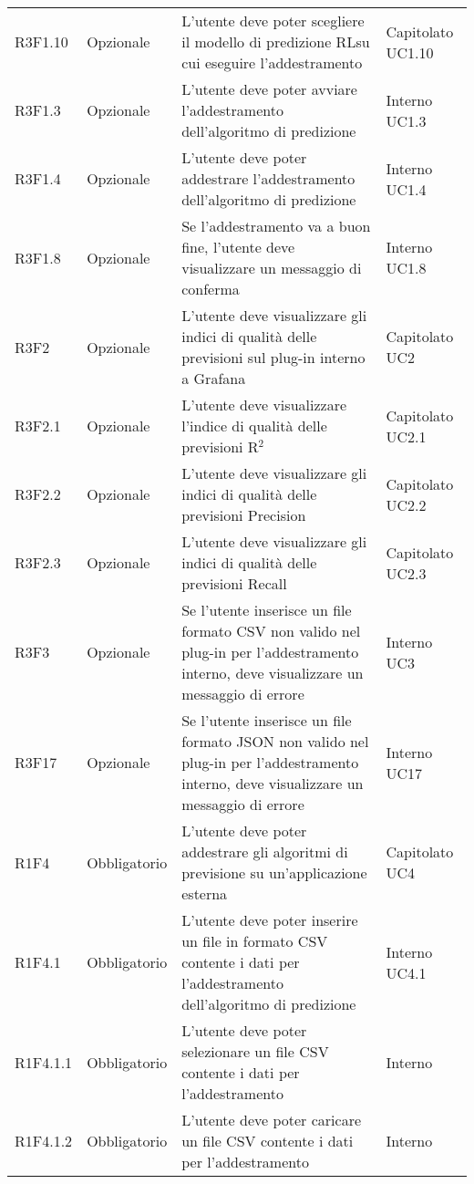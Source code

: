 \begin{longtable} {
		>{}p{24mm} 
		>{}p{32mm}
		>{}p{40mm} 
		>{}p{24.5mm}
		}
		R3F1.10 & Opzionale & L'utente deve poter scegliere il modello di predizione RL\glosp su cui eseguire l'addestramento & Capitolato UC1.10 \TBstrut \\ [2mm]
		R3F1.3 & Opzionale & L'utente deve poter avviare l'addestramento dell'algoritmo di predizione & Interno UC1.3 \TBstrut \\ [2mm]
		R3F1.4 & Opzionale & L'utente deve poter addestrare l'addestramento dell'algoritmo di predizione & Interno UC1.4 \TBstrut \\ [2mm]
		R3F1.8 & Opzionale & Se l'addestramento va a buon fine, l'utente deve visualizzare un messaggio di conferma & Interno UC1.8 \TBstrut \\ [2mm]		
		R3F2 & Opzionale & L'utente deve visualizzare gli indici di qualità delle previsioni sul plug-in interno a Grafana\glosp & Capitolato UC2 \TBstrut \\ [2mm]
		R3F2.1 & Opzionale & L'utente deve visualizzare l'indice di qualità delle previsioni R$^{2}$\glo & Capitolato UC2.1 \TBstrut \\ [2mm]
		R3F2.2 & Opzionale & L'utente deve visualizzare gli indici di qualità delle previsioni Precision & Capitolato UC2.2 \TBstrut \\ [2mm]
		R3F2.3 & Opzionale & L'utente deve visualizzare gli indici di qualità delle previsioni Recall & Capitolato UC2.3 \TBstrut \\ [2mm]
		R3F3 & Opzionale & Se l'utente inserisce un file formato CSV non valido nel plug-in per l'addestramento interno, deve visualizzare un messaggio di errore & Interno UC3 \TBstrut \\ [2mm]
		R3F17 & Opzionale & Se l'utente inserisce un file formato JSON non valido nel plug-in per l'addestramento interno, deve visualizzare un messaggio di errore & Interno UC17 \TBstrut \\ [2mm]	
		R1F4 & Obbligatorio & L'utente deve poter addestrare gli algoritmi di previsione su un'applicazione esterna & Capitolato UC4 \TBstrut \\ [2mm]		
		R1F4.1 & Obbligatorio & L'utente deve poter inserire un file in formato CSV contente i dati per l'addestramento dell'algoritmo di predizione & Interno UC4.1 \TBstrut \\ [2mm]		
		R1F4.1.1 & Obbligatorio & L'utente deve poter selezionare un file CSV contente i dati per l'addestramento & Interno \TBstrut \\ [2mm]
		R1F4.1.2 & Obbligatorio & L'utente deve poter caricare un file CSV contente i dati per l'addestramento & Interno \TBstrut \\ [2mm]

\end{longtable}
